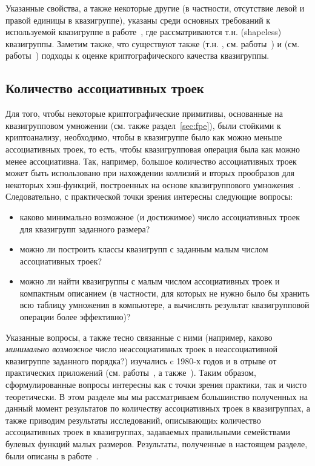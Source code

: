     Указанные свойства, а также некоторые другие (в частности, отсутствие левой и правой единицы в квазигруппе), указаны среди основных требований к используемой квазигруппе в работе~\cite{EdonR}, где рассматриваются т.н.  (shapeless) квазигруппы.
    Заметим также, что существуют также  (т.н. , см. работы~\cite{dimitrova2007classification, falcon2019computational}) и  (см. работы~\cite{markovski2005classification, bakeva2011some, ochodkova2009testing, dvorsky2009large}) подходы к оценке криптографического качества квазигруппы.
    

\subsection{Количество ассоциативных троек}
\label{subsec:assoc_problem}
    Для того, чтобы некоторые криптографические примитивы, основанные на квазигрупповом умножении (см. также раздел~\ref{sec:fpe}), были стойкими к криптоанализу, необходимо, чтобы в квазигруппе было как можно меньше ассоциативных троек, то есть, чтобы квазигрупповая операция была как можно менее ассоциативна.
    Так, например, большое количество ассоциативных троек может быть использовано при нахождении коллизий и вторых прообразов для некоторых хэш-функций, построенных на основе квазигруппового умножения~\cite{valent16}.
    Следовательно, с практической точки зрения интересны следующие вопросы:
    \begin{itemize}
        \item каково минимально возможное (и достижимое) число ассоциативных троек для квазигрупп заданного размера?
        \item можно ли построить классы квазигрупп с заданным малым числом ассоциативных троек?
        \item можно ли найти квазигруппы с малым числом ассоциативных троек и компактным описанием (в частности, для которых не нужно было бы хранить всю таблицу умножения в компьютере, а вычислять результат квазигрупповой операции более эффективно)?
    \end{itemize}

    Указанные вопросы, а также тесно связанные с ними (например, каково \textit{минимально возможное} число неассоциативных троек в неассоциативной квазигруппе заданного порядка?) изучались c 1980-х годов и в отрыве от практических приложений (см. работы~\cite{kepka1980note, kepka1981notes, drapal1981note, kotzig83, drapal1983quasigroups}, а также~\cite[задача~1.1]{keedwell}).
    Таким образом, сформулированные вопросы интересны как с точки зрения практики, так и чисто теоретически.
    В этом разделе мы мы рассматриваем большинство полученных на данный момент результатов по количеству ассоциативных троек в квазигруппах, а также приводим результаты исследований, описывающиx количество ассоциативных троек в квазигруппах, задаваемых правильными семействами булевых функций малых размеров.
    Результаты, полученные в настоящем разделе, были описаны в работе~\cite{tsar24}.



